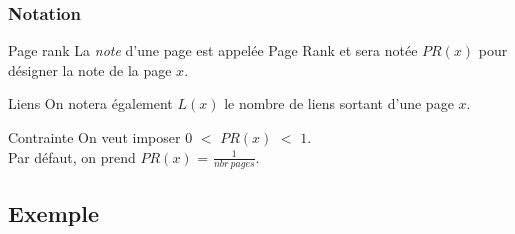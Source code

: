 \documentclass{beamer}
\begin{document}
\begin{frame}
  \tableofcontents[currentsection,subsectionstyle=hide]
\end{frame}

\begin{frame}
  \frametitle{Notation}

  \begin{block}{Page rank}
    La \emph{note} d'une page est appelée Page Rank et sera notée $PR(x)$
    pour désigner la note de la page $x$.
  \end{block}

  \pause

  \begin{block}{Liens}
    On notera également $L(x)$ le nombre de liens sortant d'une page
    $x$. 
  \end{block}

  \pause

  \begin{block}{Contrainte}
    On veut imposer $0$ $<$ $PR(x)$ $<$ $1$.\\
    Par défaut, on prend $PR(x)$ = $\frac{1}{nbr\ pages}$.
  \end{block}
\end{frame}

\subsection{Exemple}
\end{document}

